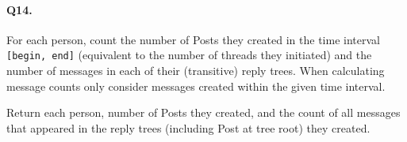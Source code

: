 \paragraph{Q14.}

For each person, count the number of Posts they created in the time
interval \texttt{{[}begin,\ end{]}} (equivalent to the number of threads
they initiated) and the number of messages in each of their (transitive)
reply trees. When calculating message counts only consider messages
created within the given time interval.

Return each person, number of Posts they created, and the count of all
messages that appeared in the reply trees (including Post at tree root)
they created.
